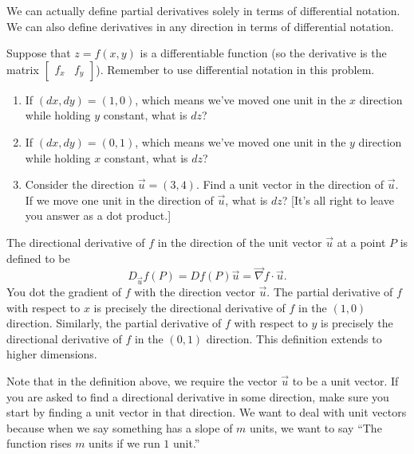 We can actually define partial derivatives solely in terms of differential notation. We can also define derivatives in any direction in terms of differential notation.

\begin{problem}
Suppose that $z=f(x,y)$ is a differentiable function (so the derivative is the matrix $\begin{bmatrix}f_x&f_y\end{bmatrix}$).  Remember to use differential notation in this problem.
\begin{enumerate}
 \item If $(dx,dy)=(1,0)$, which means we've moved one unit in the $x$ direction while holding $y$ constant, what is $dz$?
 \item If $(dx,dy)=(0,1)$, which means we've moved one unit in the $y$ direction while holding $x$ constant, what is $dz$?
 \item Consider the direction $\vec u=(3,4)$.  Find a unit vector in the direction of $\vec u$.  If we move one unit in the direction of $\vec u$, what is $dz$? [It's all right to leave you answer as a dot product.]    
\end{enumerate}
 
\end{problem}

\begin{definition}
The directional derivative of $f$ in the direction of the unit vector $\vec u$ at a point $P$ is defined to be
$$D_{\vec u} f(P) = Df(P) \vec u = \vec \nabla f \cdot \vec u.$$
You dot the gradient of $f$ with the direction vector $\vec u$.
The partial derivative of $f$ with respect to $x$ is precisely the directional derivative of $f$ in the $(1,0)$ direction.  Similarly,  
the partial derivative of $f$ with respect to $y$ is precisely the directional derivative of $f$ in the $(0,1)$ direction. 
This definition extends to higher dimensions.
\end{definition}

Note that in the definition above, we require the vector $\vec u$ to be a unit vector.  If you are asked to find a directional derivative in some direction, make sure you start by finding a unit vector in that direction. We want to deal with unit vectors because when we say something has a slope of $m$ units, we want to say ``The function rises $m$ units if we run $1$ unit.''  

